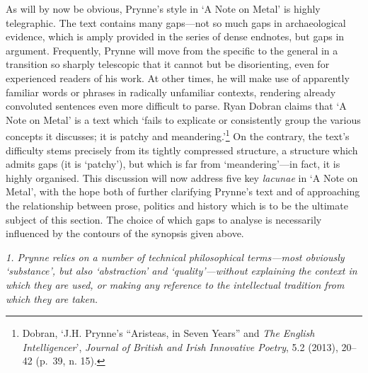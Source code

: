 \documentclass[]{article}
\begin{document}
As will by now be obvious, Prynne's style in `A Note on Metal' is highly
telegraphic. The text contains many gaps---not so much gaps in
archaeological evidence, which is amply provided in the series of dense
endnotes, but gaps in argument. Frequently, Prynne will move from the
specific to the general in a transition so sharply telescopic that it
cannot but be disorienting, even for experienced readers of his work. At
other times, he will make use of apparently familiar words or phrases in
radically unfamiliar contexts, rendering already convoluted sentences
even more difficult to parse. Ryan Dobran claims that `A Note on Metal'
is a text which `fails to explicate or consistently group the various
concepts it discusses; it is patchy and meandering.'\footnote{Dobran,
  `J.H. Prynne's ``Aristeas, in Seven Years'' and \emph{The English
  Intelligencer}', \emph{Journal of British and Irish Innovative
  Poetry}, 5.2 (2013), 20--42 (p.~39, n. 15).} On the contrary, the
text's difficulty stems precisely from its tightly compressed structure,
a structure which admits gaps (it is `patchy'), but which is far from
`meandering'---in fact, it is highly organised. This discussion will now
address five key \emph{lacunae} in `A Note on Metal', with the hope both
of further clarifying Prynne's text and of approaching the relationship
between prose, politics and history which is to be the ultimate subject
of this section. The choice of which gaps to analyse is necessarily
influenced by the contours of the synopsis given above.

\emph{1. Prynne relies on a number of technical philosophical
terms---most obviously `substance', but also `abstraction' and
`quality'---without explaining the context in which they are used, or
making any reference to the intellectual tradition from which they are
taken.}
\end{document}
